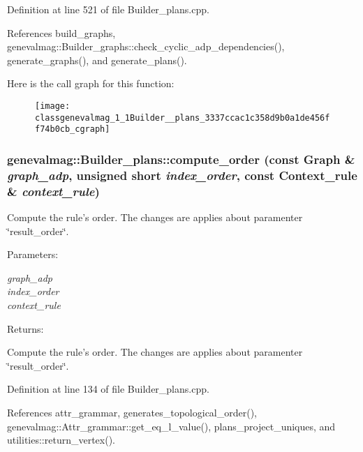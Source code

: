 Definition at line 521 of file Builder\_\-plans.cpp.

References build\_\-graphs, genevalmag::Builder\_\-graphs::check\_\-cyclic\_\-adp\_\-dependencies(), generate\_\-graphs(), and generate\_\-plans().

Here is the call graph for this function:\nopagebreak
\begin{figure}[H]
\begin{center}
\leavevmode
\texttt{[image: classgenevalmag\_1\_1Builder\_\_plans\_3337ccac1c358d9b0a1de456ff74b0cb\_cgraph]}
\end{center}
\end{figure}
\hypertarget{classgenevalmag_1_1Builder__plans_86e05ee91d27e62d16d77ecbdec05bf7}{
\subsubsection[{compute\_\-order}]{ genevalmag::Builder\_\-plans::compute\_\-order (const {\bf Graph} \& {\em graph\_\-adp}, \/  unsigned short {\em index\_\-order}, \/  const {\bf Context\_\-rule} \& {\em context\_\-rule})}}
\label{classgenevalmag_1_1Builder__plans_86e05ee91d27e62d16d77ecbdec05bf7}


Compute the rule's order. The changes are applies about paramenter \char`\"{}result\_\-order\char`\"{}. \begin{Desc}
\item[Parameters:]
\begin{description}
\item[{\em graph\_\-adp}]\item[{\em index\_\-order}]\item[{\em context\_\-rule}]\end{description}
\end{Desc}
\begin{Desc}
\item[Returns:]\end{Desc}
Compute the rule's order. The changes are applies about paramenter \char`\"{}result\_\-order\char`\"{}. 

Definition at line 134 of file Builder\_\-plans.cpp.

References attr\_\-grammar, generates\_\-topological\_\-order(), genevalmag::Attr\_\-grammar::get\_\-eq\_\-l\_\-value(), plans\_\-project\_\-uniques, and utilities::return\_\-vertex().


